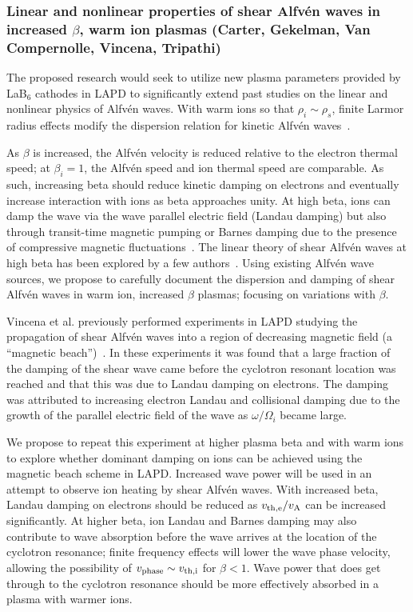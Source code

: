 \documentclass[11pt]{article}
\newcommand\Alfven{Alfv\'en }
\renewcommand{\cite}{\citep}
\begin{document}
\subsubsection{Linear and nonlinear properties of shear Alfv\'{e}n waves in
  increased $\beta$, warm ion plasmas (Carter, Gekelman, Van
  Compernolle, Vincena, Tripathi)}

The proposed research would seek to utilize new plasma parameters
provided by LaB$_6$ cathodes in LAPD to significantly extend past
studies on the linear and nonlinear physics of Alfv\'{e}n waves.  With
warm ions so that $\rho_i \sim \rho_s$, finite Larmor radius effects
modify the dispersion relation for kinetic \Alfven waves~\cite{lysak96}.

As $\beta$ is increased, the Alfv\'{e}n velocity is reduced relative
to the electron thermal speed; at $\beta_i = 1$, the Alfv\'{e}n speed
and ion thermal speed are comparable.  As such, increasing beta should
reduce kinetic damping on electrons and eventually increase
interaction with ions as beta approaches unity.  At high beta, ions
can damp the wave via the wave parallel electric field (Landau
damping) but also through transit-time magnetic pumping or Barnes
damping due to the presence of compressive magnetic
fluctuations~\cite{barnes66, hollweg71}.  The linear theory of shear
Alfv\'{e}n waves at high beta has been explored by a few
authors~\cite{schekochihin09, boldyrev13}. Using existing \Alfven wave
sources, we propose to carefully document the dispersion and damping
of shear \Alfven waves in warm ion, increased $\beta$ plasmas;
focusing on variations with $\beta$.

Vincena et al. previously performed experiments in LAPD studying the
propagation of shear Alfv\'{e}n waves into a region of decreasing
magnetic field (a ``magnetic beach'')~\cite{vincena01}.   In these
experiments it was
found that a large fraction of the damping of the shear wave came
before the cyclotron resonant location was reached and that this was
due to Landau damping on
electrons. The damping was attributed to increasing electron Landau
and collisional damping due to the growth of the parallel electric
field of the wave as $\omega/\Omega_i$ became large.

We propose to repeat this experiment at higher plasma beta and with
warm ions to explore whether dominant damping on ions can be achieved
using the magnetic beach scheme in LAPD. Increased wave power will be
used in an attempt to observe ion heating by shear Alfv\'{e}n
waves. With increased beta, Landau damping on electrons should be
reduced as $v_{\rm th,e}/v_{\rm A}$ can be increased significantly. At higher
beta, ion Landau and Barnes damping may also contribute to wave
absorption before the wave arrives at the location of the cyclotron resonance; finite
frequency effects will lower the wave phase velocity, allowing the
possibility of $v_{\rm phase} \sim v_{\rm th,i}$ for $\beta < 1$.  Wave power
that does get through to the cyclotron resonance should be more
effectively absorbed in a plasma with warmer ions.
\end{document}
